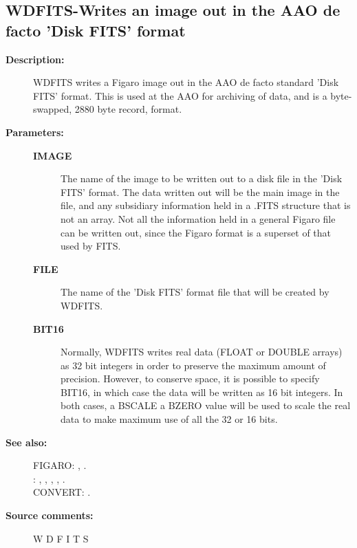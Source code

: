 \subsection{WDFITS-\label{WDFITS}Writes an image out in the AAO de facto 'Disk FITS' format}
\begin{description}

\item [\textbf{Description:}]
 WDFITS writes a Figaro image out in the AAO de facto standard
 'Disk FITS' format.  This is used at the AAO for archiving of
 data, and is a byte-swapped, 2880 byte record, format.

\item [\textbf{Parameters:}]
\begin{description}
\item [\textbf{IMAGE}]
 The name of the image to be written out to
 a disk file in the 'Disk FITS' format.  The data
 written out will be the main image in the file, and
 any subsidiary information held in a .FITS structure
 that is not an array.  Not all the information held in
 a general Figaro file can be written out, since the
 Figaro format is a superset of that used by FITS.
\item [\textbf{FILE}]
 The name of the 'Disk FITS' format file that
 will be created by WDFITS.
\item [\textbf{BIT16}]
 Normally, WDFITS writes real data (FLOAT or DOUBLE arrays)
 as 32 bit integers in order to preserve the maximum
 amount of precision.  However, to conserve space, it is
 possible to specify BIT16, in which case the data will
 be written as 16 bit integers.  In both cases, a BSCALE
 a BZERO value will be used to scale the real data to make
 maximum use of all the 32 or 16 bits.
\end{description}

\item [\textbf{See also:}]
FIGARO: , .\\
: , , , , .\\
CONVERT: .\\

\item [\textbf{Source comments:}]
\begin{terminalv}
 W D F I T S


\end{terminalv}
\end{description}

